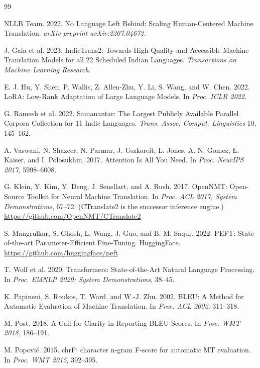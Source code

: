 \documentclass[sigconf]{acmart}
\begin{document}
\begin{thebibliography}{99}

NLLB Team. 2022. No Language Left Behind: Scaling Human-Centered Machine Translation.
\textit{arXiv preprint arXiv:2207.04672}.

J. Gala et al. 2023. IndicTrans2: Towards High-Quality and Accessible Machine
Translation Models for all 22 Scheduled Indian Languages.
\textit{Transactions on Machine Learning Research}.

E. J. Hu, Y. Shen, P. Wallis, Z. Allen-Zhu, Y. Li, S. Wang, and W. Chen. 2022.
LoRA: Low-Rank Adaptation of Large Language Models.
In \textit{Proc. ICLR 2022}.

G. Ramesh et al. 2022. Samanantar: The Largest Publicly Available Parallel Corpora
Collection for 11 Indic Languages.
\textit{Trans. Assoc. Comput. Linguistics} 10, 145--162.

A. Vaswani, N. Shazeer, N. Parmar, J. Uszkoreit, L. Jones, A. N. Gomez,
\L. Kaiser, and I. Polosukhin. 2017. Attention Is All You Need.
In \textit{Proc. NeurIPS 2017}, 5998--6008.

G. Klein, Y. Kim, Y. Deng, J. Senellart, and A. Rush. 2017.
OpenNMT: Open-Source Toolkit for Neural Machine Translation.
In \textit{Proc. ACL 2017, System Demonstrations}, 67--72.
(CTranslate2 is the successor inference engine.)
\url{https://github.com/OpenNMT/CTranslate2}

S. Mangrulkar, S. Ghosh, L. Wang, J. Guo, and B. M. Saqur. 2022.
PEFT: State-of-the-art Parameter-Efficient Fine-Tuning.
HuggingFace. \url{https://github.com/huggingface/peft}

T. Wolf et al. 2020. Transformers: State-of-the-Art Natural Language Processing.
In \textit{Proc. EMNLP 2020: System Demonstrations}, 38--45.

K. Papineni, S. Roukos, T. Ward, and W.-J. Zhu. 2002.
BLEU: A Method for Automatic Evaluation of Machine Translation.
In \textit{Proc. ACL 2002}, 311--318.

M. Post. 2018. A Call for Clarity in Reporting BLEU Scores.
In \textit{Proc. WMT 2018}, 186--191.

M. Popovi\'{c}. 2015. chrF: character n-gram F-score for automatic MT evaluation.
In \textit{Proc. WMT 2015}, 392--395.


\end{thebibliography}
\end{document}
